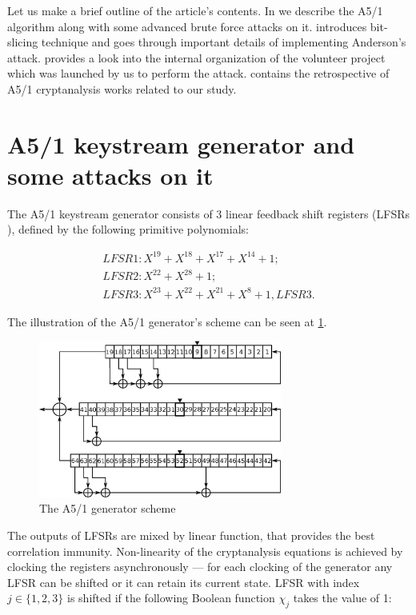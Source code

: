 \documentclass[runningheads,a4paper]{llncs}[2015/06/24]
\begin{document}
Let us make a brief outline of the article's contents. In  we
describe the A5/1 algorithm along with some advanced brute force attacks on it.
 introduces bit-slicing technique and goes through important
details of implementing Anderson's attack. 
provides a look into the internal organization of the volunteer project which was launched by us to perform the attack.  contains the retrospective of A5/1 cryptanalysis works related to our study.

\section{A5/1 keystream generator and some attacks on it}
\label{sec:alg}

The A5/1 keystream generator consists of 3 linear feedback shift registers (\mbox{LFSRs} \cite{Menezes:1996:HAC:548089}), 
defined by the following primitive polynomials:

\begin{gather*} 
	LFSR1: X^{19}+X^{18}+X^{17}+X^{14}+1;\\
	LFSR2: X^{22}+X^{28}+1;\\
	LFSR3: X^{23}+X^{22}+X^{21}+X^{8}+1, LFSR3.
\end{gather*}

The illustration of the A5/1 generator's scheme can be seen at
\cref{fig:a51gen}.

\begin{figure}
	\centering
	\includegraphics[width=8cm]{./a51.eps} 
	\caption{The A5/1 generator scheme} 
	\label{fig:a51gen} 
\end{figure}

The outputs of LFSRs are mixed by linear function, that provides the best
correlation immunity. Non-linearity of the cryptanalysis equations is achieved by clocking
the registers asynchronously --- for each clocking of the generator any LFSR 
can be shifted or it can retain its current state.
LFSR with index $j \in \{1,2,3\}$ is shifted if the following Boolean
function $\chi_j$ takes the value of 1:
\end{document}
